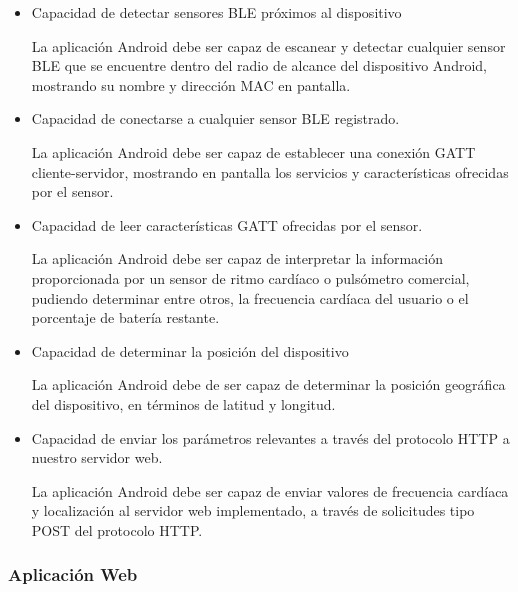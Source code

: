 \begin{itemize}
	
\item Capacidad de detectar sensores \ac{BLE} próximos al dispositivo

La aplicación Android debe ser capaz de escanear y detectar cualquier sensor BLE que se encuentre dentro del radio de alcance del dispositivo Android, mostrando su nombre y dirección \ac{MAC} en pantalla.

\item Capacidad de conectarse a cualquier sensor BLE registrado.

La aplicación Android debe ser capaz de establecer una conexión GATT cliente-servidor, mostrando en pantalla los servicios y características ofrecidas por el sensor.

\item Capacidad de leer características GATT ofrecidas por el sensor.

La aplicación Android debe ser capaz de interpretar la información proporcionada por un sensor de ritmo cardíaco o pulsómetro comercial, pudiendo determinar entre otros, la frecuencia cardíaca del usuario o el porcentaje de batería restante.

\item Capacidad de determinar la posición del dispositivo

La aplicación Android debe de ser capaz de determinar la posición geográfica del dispositivo, en términos de latitud y longitud.

\item Capacidad de enviar los parámetros relevantes a través del protocolo HTTP a nuestro servidor web.

La aplicación Android debe ser capaz de enviar valores de frecuencia cardíaca y  localización al servidor web implementado, a través de solicitudes tipo POST del protocolo HTTP.

\end{itemize}

\subsubsection{Aplicación Web}

